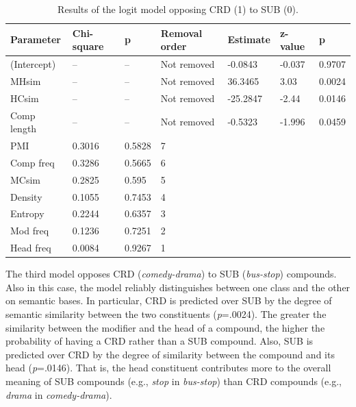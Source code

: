 \begin{table}[b!]
\centering
\small
\begin{tabular}{|l|l|l|l|l|l|l|}
\hline
Parameter   & Chi-square & p      & Removal order & Estimate & z-value & p      \\ \hline
(Intercept) & --       & --     & Not removed   & -0.0843  & -0.037  & 0.9707 \\
MHsim       & --       & --     & Not removed   & 36.3465  & 3.03    & 0.0024 \\
HCsim       & --       & --     & Not removed   & -25.2847 & -2.44   & 0.0146 \\
Comp length & --       & --     & Not removed   & -0.5323  & -1.996  & 0.0459 \\
PMI         & 0.3016   & 0.5828 & 7             &          &         &        \\
Comp freq   & 0.3286   & 0.5665 & 6             &          &         &        \\
MCsim       & 0.2825   & 0.595  & 5             &          &         &        \\
Density     & 0.1055   & 0.7453 & 4             &          &         &        \\
Entropy     & 0.2244   & 0.6357 & 3             &          &         &        \\
Mod freq    & 0.1236   & 0.7251 & 2             &          &         &        \\
Head freq   & 0.0084   & 0.9267 & 1             &          &         &        \\ \hline
\end{tabular}
\caption{Results of the logit model opposing CRD (1) to SUB (0).}
\label{tab:reascrdsub}
\end{table}

The third model opposes CRD (\emph{comedy-drama}) to SUB (\emph{bus-stop}) compounds. Also in this case, the model reliably distinguishes between one class and the other on semantic bases. In particular, CRD is predicted over SUB by the degree of semantic similarity between the two constituents (\emph{p}=.0024). The greater the similarity between the modifier and the head of a compound, the higher the probability of having a CRD rather than a SUB compound. Also, SUB is predicted over CRD by the degree of similarity between the compound and its head (\emph{p}=.0146). That is, the head constituent contributes more to the overall meaning of SUB compounds (e.g., \emph{stop} in \emph{bus-stop}) than CRD compounds (e.g., \emph{drama} in \emph{comedy-drama}).

